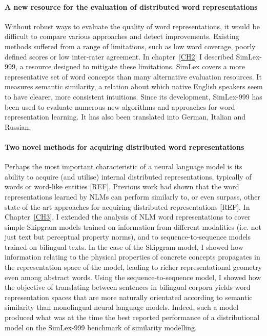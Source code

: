 \paragraph{A new resource for the evaluation of distributed word representations} Without robust ways to evaluate the quality of word representations, it would be difficult to compare various approaches and detect improvements. Existing methods suffered from a range of limitations, such as low word coverage, poorly defined scores or low inter-rater agreement. In chapter~\ref{CH2} I described SimLex-999, a resource designed to mitigate these limitations. SimLex covers a more representative set of word concepts than many alternative evaluation resources. It measures semantic similarity, a relation about which native English speakers seem to have clearer, more consistent intuitions. Since its development, SimLex-999 has been used to evaluate numerous new algorithms and approaches for word representation learning. It has also been translated into German, Italian and Russian. 

\paragraph{Two novel methods for acquiring distributed word representations} Perhaps the most important characteristic of a neural language model is its ability to acquire (and utilise) internal distributed representations, typically of words or word-like entities [REF]. Previous work had shown that the word representations learned by NLMs can perform similarly to, or even surpass, other state-of-the-art approaches for acquiring distributed representations [REF]. In Chapter~\ref{CH3}, I extended the analysis of NLM word representations to cover simple Skipgram models trained on information from different modalities (i.e. not just text but perceptual property norms), and to sequence-to-sequence models trained on bilingual texts. In the case of the Skipgram model, I showed how information relating to the physical properties of concrete concepts propagates in the representation space of the model, leading to richer representational geometry even among abstract words. Using the sequence-to-sequence model, I showed how the objective of translating between sentences in bilingual corpora yields word representation spaces that are more naturally orientated according to semantic similarity than monolingual neural language models. Indeed, such a model produced what was at the time the best reported performance of a distributional model on the SimLex-999 benchmark of similarity modelling.  


